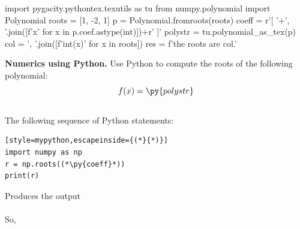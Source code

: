 \begin{pycode}
import pygacity.pythontex.texutils as tu
from numpy.polynomial import Polynomial
roots = [1, -2, 1]
p = Polynomial.fromroots(roots)
coeff = r'[ '+', '.join([f'{x}' for x in p.coef.astype(int)])+r' ]'
polystr = tu.polynomial_as_tex(p)
col = ', '.join([f'{int(x)}' for x in roots])
res = f'the roots are {col}.'
\end{pycode}
\textbf{Numerics using Python.} Use Python to compute the roots of the following polynomial:
\[
	f(x)=\py{polystr}
\]
\ifshowsolutions
\Solutionheader\\
The following sequence of Python statements:
\begin{lstlisting}[style=mypython,escapeinside={(*}{*)}]
import numpy as np
r = np.roots((*\py{coeff}*))
print(r)
\end{lstlisting}
Produces the output\\
\texttt{}\\ 
So, 
\else
	\par\vspace{0.4cm}
\fi
	